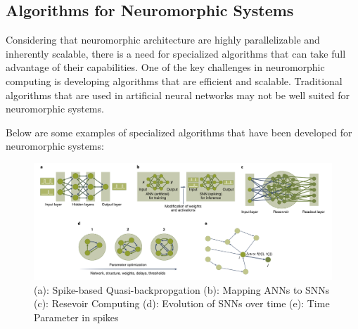 \documentclass[screen, acmtog]{acmart}
\begin{document}
\subsection{Algorithms for Neuromorphic Systems \cite{NCalgo}}

Considering that neuromorphic architecture are highly parallelizable and inherently scalable, there is a need for specialized algorithms that can take full advantage of their capabilities. One of the key challenges in neuromorphic computing is developing algorithms that are efficient and scalable. Traditional algorithms that are used in artificial neural networks may not be well suited for neuromorphic systems. 

Below are some examples of specialized algorithms that have been developed for neuromorphic systems:

\begin{figure}
    \centering
    \includegraphics[width=1\linewidth]{algoNC.png}
    \caption{\cite{NCalgo} (a): Spike-based Quasi-backpropgation (b): Mapping ANNs to SNNs (c): Resevoir Computing (d): Evolution of SNNs over time (e): Time Parameter in spikes}
    \label{fig:AlgoNC}
\end{figure}
\end{document}
